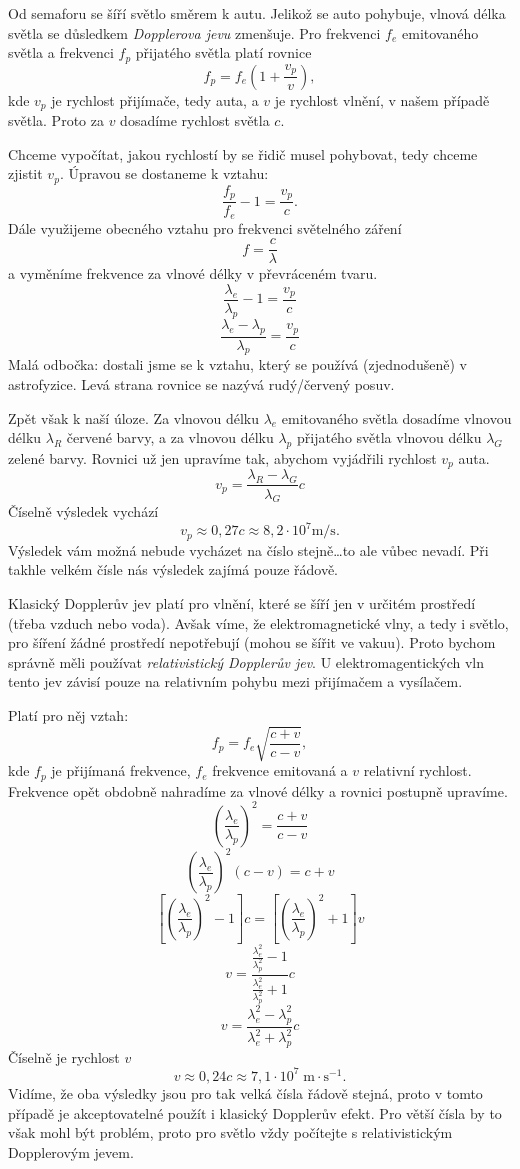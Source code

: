 \documentclass{../../../../style/mkimain}
\begin{document}
\noindent{}
\klein
Od semaforu se šíří světlo směrem k autu. Jelikož se auto pohybuje, vlnová délka světla se důsledkem \emph{Dopplerova jevu} zmenšuje.
Pro frekvenci $f_e$ emitovaného světla a frekvenci $f_p$ přijatého světla platí rovnice
$$f_p=f_e\left(1+\frac{v_p}{v}\right),$$
kde $v_p$ je rychlost přijímače, tedy auta, a $v$ je rychlost vlnění, v našem případě světla.
Proto za $v$ dosadíme rychlost světla $c$.

Chceme vypočítat, jakou rychlostí by se řidič musel pohybovat, tedy chceme zjistit $v_p$.
Úpravou se dostaneme k vztahu:
$$\frac{f_p}{f_e}-1=\frac{v_p}{c}.$$
Dále využijeme obecného vztahu pro frekvenci světelného záření
$$f=\frac{c}{\lambda}$$
a vyměníme frekvence za vlnové délky v převráceném tvaru.
$$\frac{\lambda_e}{\lambda_p}-1=\frac{v_p}{c}$$
$$\frac{\lambda_e-\lambda_p}{\lambda_p}=\frac{v_p}{c}$$
Malá odbočka: dostali jsme se k vztahu, který se používá (zjednodušeně) v astrofyzice. Levá strana rovnice se nazývá rudý/červený posuv.

Zpět však k naší úloze.
Za vlnovou délku $\lambda_e$ emitovaného světla dosadíme vlnovou délku $\lambda_R$ červené barvy, a za vlnovou délku $\lambda_p$ přijatého světla vlnovou délku $\lambda_G$ zelené barvy. 
Rovnici už jen upravíme tak, abychom vyjádřili rychlost $v_p$ auta.
$${v_p}=\frac{\lambda_R-\lambda_G}{\lambda_G}c$$
Číselně výsledek vychází
$$v_p\approx0,27c\approx8,2\cdot10^7\si{\m\per\s}\text{.}$$
Výsledek vám možná nebude vycházet na číslo stejně\dots to ale vůbec nevadí. Při takhle velkém čísle nás výsledek zajímá pouze řádově.

Klasický Dopplerův jev platí pro vlnění, které se šíří jen v určitém prostředí (třeba vzduch nebo voda).
Avšak víme, že elektromagnetické vlny, a tedy i světlo, pro šíření žádné prostředí nepotřebují (mohou se šířit ve vakuu).
Proto bychom správně měli používat \textit{relativistický Dopplerův jev}.
U elektromagentických vln tento jev závisí pouze na relativním pohybu mezi přijímačem a vysílačem.

\noindent
Platí pro něj vztah:
$$f_p=f_e\sqrt{\frac{c+v}{c-v}},$$
kde $f_p$ je přijímaná frekvence, $f_e$ frekvence emitovaná a $v$ relativní rychlost.
Frekvence opět obdobně nahradíme za vlnové délky a rovnici postupně upravíme.
$$\left(\frac{\lambda_e}{\lambda_p}\right)^2=\frac{c+v}{c-v}$$
$$\left(\frac{\lambda_e}{\lambda_p}\right)^2\left(c-v\right)={c+v}$$
$$\left[\left(\frac{\lambda_e}{\lambda_p}\right)^2-1\right]c=\left[\left(\frac{\lambda_e}{\lambda_p}\right)^2+1\right]v$$
$$v=\frac{\frac{\lambda_e^2}{\lambda_p^2}-1}{\frac{\lambda_e^2}{\lambda_p^2}+1}c$$
$$v=\frac{\lambda_e^2-\lambda_p^2}{\lambda_e^2+\lambda_p^2}c$$
Číselně je rychlost $v$
$$v\approx0,24c\approx7,1\cdot10^7\;\mathrm{m\cdot s^{-1}}.$$
Vidíme, že oba výsledky jsou pro tak velká čísla řádově stejná, proto v tomto případě je akceptovatelné použít i klasický Dopplerův efekt.
Pro větší čísla by to však mohl být problém, proto pro světlo vždy počítejte s relativistickým Dopplerovým jevem.
\end{document}
